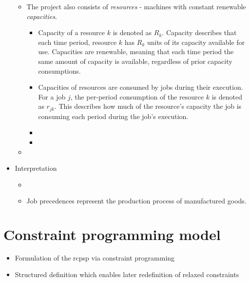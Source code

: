 \begin{itemize}
\begin{itemize}
        \item The project also consists of \emph{resources} - machines with constant renewable \emph{capacities}.
        \begin{itemize}
            \item Capacity of a resource $k$ is denoted as $R_k$. Capacity describes that each time period,
                resource $k$ has $R_k$ units of its capacity available for use. Capacities are renewable,
                meaning that each time period the same amount of capacity is available, regardless of prior
                capacity consumptions.

            \item Capacities of resources are consumed by jobs during their execution. For a job $j$,
                the per-period consumption of the resource $k$ is denoted as $r_{jk}$. This describes how much
                of the resource's capacity the job is consuming each period during the job's execution.

            \item {}
            \item {}
        \end{itemize}

        \item {}
    \end{itemize}

    \item Interpretation
    \begin{itemize}
        \item {}
        \item Job precedences represent the production process of manufactured goods.
    \end{itemize}
\end{itemize}

\section{Constraint programming model}

\begin{itemize}
    \item Formulation of the \ac{rcpsp} via constraint programming
    \item Structured definition which enables later redefinition of relaxed constraints
\end{itemize}

